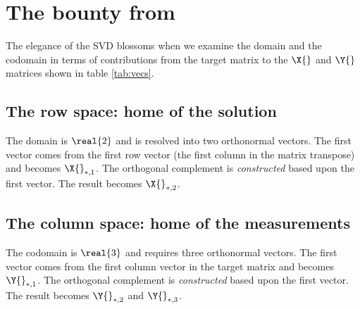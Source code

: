 \section[The bounty from the SVD]{The bounty from \svdl}
The elegance of the SVD blossoms when we examine the domain and the codomain in terms of contributions from the target matrix to the $\X{}$ and $\Y{}$ matrices shown in table \eqref{tab:vecs}.

\subsection{The row space: home of the solution}
The domain is $\real{2}$ and is resolved into two orthonormal vectors. The first vector comes from the first row vector (the first column in the matrix transpose) and becomes  $\X{}_{*,1}$. The orthogonal complement is \textit{constructed} based upon the first vector. The result becomes $\X{}_{*,2}$.

\subsection{The column space: home of the measurements}
The codomain is $\real{3}$ and requires three orthonormal vectors. The first vector comes from the first column vector in the target matrix and becomes  $\Y{}_{*,1}$. The orthogonal complement is \textit{constructed} based upon the first vector. The result becomes $\Y{}_{*,2}$ and $\Y{}_{*,3}$.

